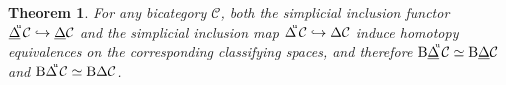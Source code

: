 \documentclass[]{amsart}
\newtheorem{theorem}{Theorem}[section]
\begin{document}
\begin{theorem}\label{1.2.24} For any bicategory ${\ensuremath{\mathcal{C}}}$, both the simplicial inclusion functor ${\ensuremath{\underline{\Delta}}}\hspace{-3pt}^{^\mathrm{u}}{\ensuremath{\mathcal{C}}}\hookrightarrow {\ensuremath{\underline{\Delta}}}{\ensuremath{\mathcal{C}}}$  and the simplicial inclusion map ${\ensuremath{\Delta}}\hspace{-3pt}^{^\mathrm{u}}{\ensuremath{\mathcal{C}}}\hookrightarrow{\ensuremath{\Delta}}{\ensuremath{\mathcal{C}}}$ induce
homotopy equivalences on the corresponding classifying spaces, and therefore
 ${\ensuremath{\mathrm{B}}}{\ensuremath{\underline{\Delta}}}\hspace{-3pt}^{^\mathrm{u}}{\ensuremath{\mathcal{C}}} \simeq {\ensuremath{\mathrm{B}}}{\ensuremath{\underline{\Delta}}}{\ensuremath{\mathcal{C}}}$ and
${\ensuremath{\mathrm{B}}}{\ensuremath{\Delta}}\hspace{-3pt}^{^\mathrm{u}}{\ensuremath{\mathcal{C}}}\simeq {\ensuremath{\mathrm{B}}}{\ensuremath{\Delta}}{\ensuremath{\mathcal{C}}}$.
\end{theorem}
\end{document}

